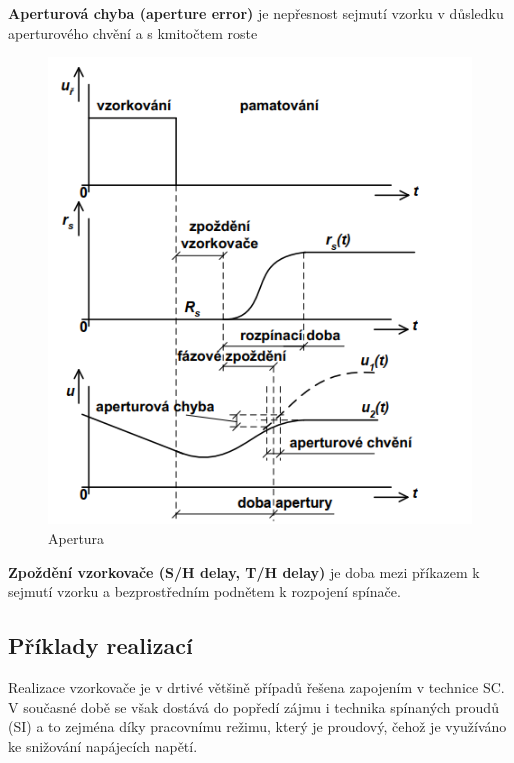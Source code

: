 \textbf{Aperturová chyba (aperture error)} je nepřesnost sejmutí vzorku v důsledku aperturového
chvění a s kmitočtem roste
   \begin{figure}[h]
   \begin{center}
     \includegraphics[scale=0.6]{images/Apertura.png}
   \end{center}
   \caption{Apertura}
  \end{figure}
  
\textbf{Zpoždění vzorkovače (S/H delay, T/H delay)} je doba mezi příkazem k sejmutí vzorku a bezprostředním podnětem k rozpojení spínače.

\subsection{Příklady realizací}
Realizace vzorkovače je v drtivé většině případů řešena zapojením v technice SC. V současné době se však dostává do popředí zájmu i technika spínaných proudů (SI) a to zejména díky pracovnímu režimu, který je proudový, čehož je využíváno ke snižování napájecích napětí.

